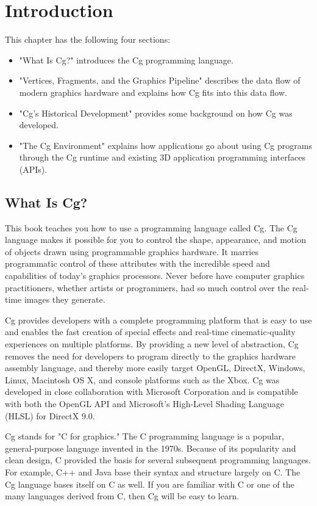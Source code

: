 \documentclass[../main.tex]{subfiles}
\begin{document}
\chapter{Introduction}

This chapter has the following four sections:

\FloatBarrier
\begin{itemize}
\item "What Is Cg?" introduces the Cg programming language.
\item "Vertices, Fragments, and the Graphics Pipeline" describes the data flow of modern graphics hardware and explains how Cg fits into this data flow.
\item "Cg's Historical Development" provides some background on how Cg was developed.
\item "The Cg Environment" explains how applications go about using Cg programs through the Cg runtime and existing 3D application programming interfaces (APIs).
\end{itemize}
\FloatBarrier

\section{What Is Cg?}

This book teaches you how to use a programming language called Cg. The Cg language makes it possible for you to control the shape, appearance, and motion of objects drawn using programmable graphics hardware. It marries programmatic control of these attributes with the incredible speed and capabilities of today's graphics processors. Never before have computer graphics practitioners, whether artists or programmers, had so much control over the real-time images they generate.

Cg provides developers with a complete programming platform that is easy to use and enables the fast creation of special effects and real-time cinematic-quality experiences on multiple platforms. By providing a new level of abstraction, Cg removes the need for developers to program directly to the graphics hardware assembly language, and thereby more easily target OpenGL, DirectX, Windows, Linux, Macintosh OS X, and console platforms such as the Xbox. Cg was developed in close collaboration with Microsoft Corporation and is compatible with both the OpenGL API and Microsoft's High-Level Shading Language (HLSL) for DirectX 9.0.

Cg stands for "C for graphics." The C programming language is a popular, general-purpose language invented in the 1970s. Because of its popularity and clean design, C provided the basis for several subsequent programming languages. For example, C++ and Java base their syntax and structure largely on C. The Cg language bases itself on C as well. If you are familiar with C or one of the many languages derived from C, then Cg will be easy to learn.
\end{document}
